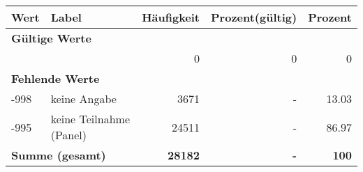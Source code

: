      \begin{longtable}{lXrrr}
     \toprule
     \textbf{Wert} & \textbf{Label} & \textbf{Häufigkeit} & \textbf{Prozent(gültig)} & \textbf{Prozent} \\
     \endhead
     \midrule
     \multicolumn{5}{l}{\textbf{Gültige Werte}}\\
      & & 0 & 0 & 0 \\
     \midrule
     \multicolumn{5}{l}{\textbf{Fehlende Werte}}\\
       -998 &
       keine Angabe &
         \num{3671} &
        - &
         \num[round-mode=places,round-precision=2]{13,03} \\
       -995 &
       keine Teilnahme (Panel) &
         \num{24511} &
        - &
         \num[round-mode=places,round-precision=2]{86,97} \\
     \midrule
     \multicolumn{2}{l}{\textbf{Summe (gesamt)}} &
          \textbf{\num{28182}} &
        \textbf{-} &
        \textbf{100} \\
     \bottomrule
     \end{longtable}
     

